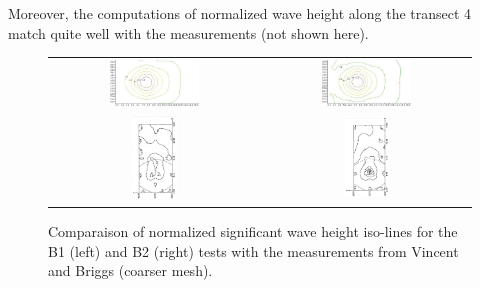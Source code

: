 \begin{itemize}
  Moreover, the computations of normalized wave height along the transect 4
  match quite well with the measurements (not shown here).
\begin{figure}[H]
  \centering
  \begin{tabular}{cc}
    \includegraphics[width=0.45\textwidth]{iso-B1.jpg}&
    \includegraphics[width=0.45\textwidth]{iso-B2.jpg}\\
  	\includegraphics[width=0.22\textwidth,angle=-90]{B1_m.JPG}
 	&
    \includegraphics[width=0.22\textwidth,angle=-90]{B2_m.JPG}\\
     \end{tabular}
  \caption{Comparaison of normalized significant wave height iso-lines for
    the B1 (left) and B2 (right) tests with the measurements from Vincent and
    Briggs (coarser mesh).}
\label{comparisonVB}
\end{figure}


\end{itemize}
